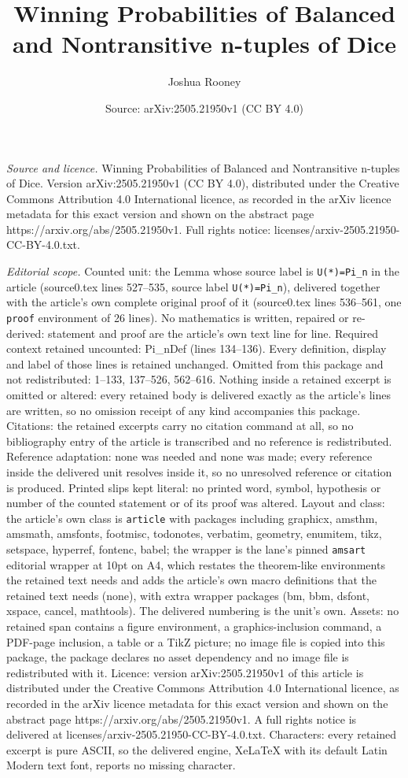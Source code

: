 \documentclass[10pt,a4paper]{amsart}
\title[Winning Probabilities of Balanced and Nontransitive n-tuples]{Winning Probabilities of Balanced and Nontransitive n-tuples of Dice}
\author{Joshua Rooney}
\date{Source: arXiv:2505.21950v1 (CC BY 4.0)}
\begin{document}
\maketitle

\noindent\emph{Source and licence.} Winning Probabilities of Balanced and Nontransitive n-tuples of Dice. Version arXiv:2505.21950v1 (CC BY 4.0), distributed under the Creative Commons Attribution 4.0 International licence, as recorded in the arXiv licence metadata for this exact version and shown on the abstract page https://arxiv.org/abs/2505.21950v1. Full rights notice: licenses/arxiv-2505.21950-CC-BY-4.0.txt.\par\smallskip

\noindent\textit{Editorial scope.} Counted unit: the Lemma whose source label is \texttt{U(*)=Pi\_n} in the article (source0.tex lines 527--535, source label \texttt{U(*)=Pi\_n}), delivered together with the article's own complete original proof of it (source0.tex lines 536--561, one \texttt{proof} environment of 26 lines). No mathematics is written, repaired or re-derived: statement and proof are the article's own text line for line. Required context retained uncounted: Pi\_nDef (lines 134--136). Every definition, display and label of those lines is retained unchanged. Omitted from this package and not redistributed: 1--133, 137--526, 562--616. Nothing inside a retained excerpt is omitted or altered: every retained body is delivered exactly as the article's lines are written, so no omission receipt of any kind accompanies this package. Citations: the retained excerpts carry no citation command at all, so no bibliography entry of the article is transcribed and no reference is redistributed. Reference adaptation: none was needed and none was made; every reference inside the delivered unit resolves inside it, so no unresolved reference or citation is produced. Printed slips kept literal: no printed word, symbol, hypothesis or number of the counted statement or of its proof was altered. Layout and class: the article's own class is \texttt{article} with packages including graphicx, amsthm, amsmath, amsfonts, footmisc, todonotes, verbatim, geometry, enumitem, tikz, setspace, hyperref, fontenc, babel; the wrapper is the lane's pinned \texttt{amsart} editorial wrapper at 10pt on A4, which restates the theorem-like environments the retained text needs and adds the article's own macro definitions that the retained text needs (none), with extra wrapper packages (bm, bbm, dsfont, xspace, cancel, mathtools). The delivered numbering is the unit's own. Assets: no retained span contains a figure environment, a graphics-inclusion command, a PDF-page inclusion, a table or a TikZ picture; no image file is copied into this package, the package declares no asset dependency and no image file is redistributed with it. Licence: version arXiv:2505.21950v1 of this article is distributed under the Creative Commons Attribution 4.0 International licence, as recorded in the arXiv licence metadata for this exact version and shown on the abstract page https://arxiv.org/abs/2505.21950v1. A full rights notice is delivered at licenses/arxiv-2505.21950-CC-BY-4.0.txt. Characters: every retained excerpt is pure ASCII, so the delivered engine, XeLaTeX with its default Latin Modern text font, reports no missing character.
\end{document}
